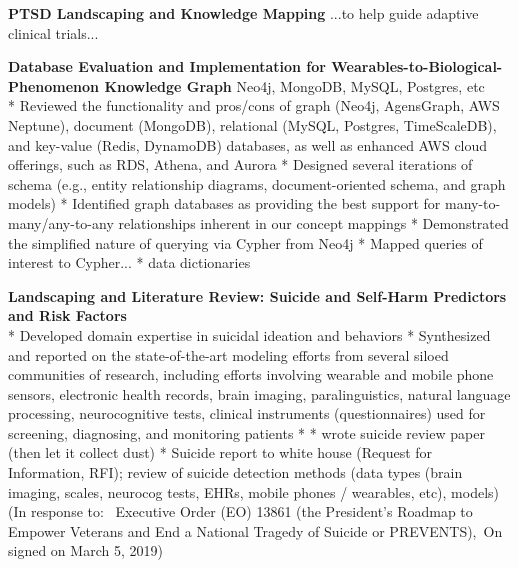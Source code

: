 \begin{itemize*}
  \item\leftandright
    {\textbf{PTSD Landscaping and Knowledge Mapping}}
    ...to help guide adaptive clinical trials...
  \item\leftandright
    {\textbf{Database Evaluation and Implementation for
    Wearables-to-Biological-Phenomenon Knowledge Graph}}
    {\small{Neo4j, MongoDB, MySQL, Postgres, etc}} \\  
    * Reviewed the functionality and pros/cons of graph (Neo4j,
      AgensGraph, AWS Neptune), document (MongoDB), relational (MySQL,
      Postgres, TimeScaleDB), and key-value (Redis, DynamoDB) databases,
      as well as enhanced AWS cloud offerings, such as RDS, Athena, and
      Aurora
    * Designed several iterations of schema (e.g., entity relationship
      diagrams, document-oriented schema, and graph models)
    * Identified graph databases as providing the best support for 
      many-to-many/any-to-any relationships inherent in our concept
      mappings
    * Demonstrated the simplified nature of querying via Cypher from Neo4j 
    * Mapped queries of interest to Cypher...
    * data dictionaries
  \item\leftandright
    {\textbf{Landscaping and Literature Review: Suicide and Self-Harm Predictors and Risk Factors}}
    {\small{}} \\  
    * Developed domain expertise in suicidal ideation and behaviors
    * Synthesized and reported on the state-of-the-art modeling efforts from several
      siloed communities of research, including efforts involving
      wearable and mobile phone sensors, electronic health records,
      brain imaging, paralinguistics, natural language processing, 
      neurocognitive tests, clinical instruments
      (questionnaires) used for screening, diagnosing, and monitoring
      patients 
    * * wrote suicide review paper (then let it collect dust)
    * Suicide report to white house (Request for Information, RFI);
    review of suicide detection methods (data types (brain imaging,
    scales, neurocog tests, EHRs, mobile phones / wearables, etc),
    models)  (In response to:  Executive Order (EO) 13861 (the
    President’s Roadmap to Empower Veterans and End a National Tragedy
    of Suicide or PREVENTS), On signed on March 5, 2019)
\end{itemize*}
